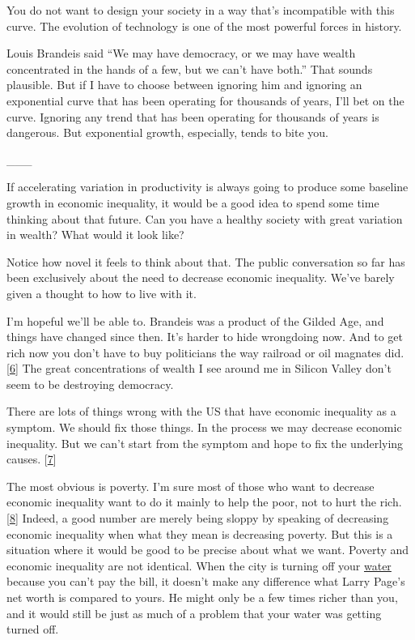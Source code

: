You do not want to design your society in a way that's incompatible with
this curve. The evolution of technology is one of the most powerful
forces in history.

Louis Brandeis said ``We may have democracy, or we may have wealth
concentrated in the hands of a few, but we can't have both.'' That
sounds plausible. But if I have to choose between ignoring him and
ignoring an exponential curve that has been operating for thousands of
years, I'll bet on the curve. Ignoring any trend that has been operating
for thousands of years is dangerous. But exponential growth, especially,
tends to bite you.

\_\_\_

If accelerating variation in productivity is always going to produce
some baseline growth in economic inequality, it would be a good idea to
spend some time thinking about that future. Can you have a healthy
society with great variation in wealth? What would it look like?

Notice how novel it feels to think about that. The public conversation
so far has been exclusively about the need to decrease economic
inequality. We've barely given a thought to how to live with it.

I'm hopeful we'll be able to. Brandeis was a product of the Gilded Age,
and things have changed since then. It's harder to hide wrongdoing now.
And to get rich now you don't have to buy politicians the way railroad
or oil magnates did. {[}\hyperref[f6n]{6}{]} The great concentrations of
wealth I see around me in Silicon Valley don't seem to be destroying
democracy.

There are lots of things wrong with the US that have economic inequality
as a symptom. We should fix those things. In the process we may decrease
economic inequality. But we can't start from the symptom and hope to fix
the underlying causes. {[}\hyperref[f7n]{7}{]}

The most obvious is poverty. I'm sure most of those who want to decrease
economic inequality want to do it mainly to help the poor, not to hurt
the rich. {[}\hyperref[f8n]{8}{]} Indeed, a good number are merely being
sloppy by speaking of decreasing economic inequality when what they mean
is decreasing poverty. But this is a situation where it would be good to
be precise about what we want. Poverty and economic inequality are not
identical. When the city is turning off your
\href{http://www.theatlantic.com/business/archive/2014/07/what-happens-when-detroit-shuts-off-the-water-of-100000-people/374548/}{water}
because you can't pay the bill, it doesn't make any difference what
Larry Page's net worth is compared to yours. He might only be a few
times richer than you, and it would still be just as much of a problem
that your water was getting turned off.

